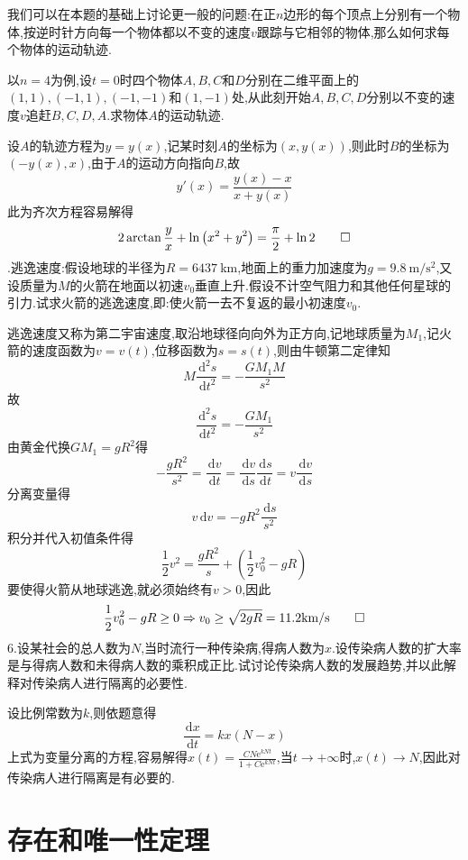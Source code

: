 \documentclass[titlepage,11pt,a4paper,twoside]{report}
\makeatletter
\newcommand\diff{\,\mathrm{d}}
\newcommand\e{\mathrm{e}}
\newenvironment{solve}{\par
	\pushQED{\qed}%
	\normalfont \topsep1\p@\@plus6\p@\relax
	\trivlist
	\item\relax
	{\hspace*{\parindent}{\heiti 解}\@addpunct{:}}\hspace\labelsep\ignorespaces
}{%
	\popQED\endtrivlist\@endpefalse
}
\makeatother
\begin{document}
我们可以在本题的基础上讨论更一般的问题:在正$n$边形的每个顶点上分别有一个物体,按逆时针方向每一个物体都以不变的速度$v$跟踪与它相邻的物体,那么如何求每个物体的运动轨迹.\par
以$n=4$为例,设$t=0$时四个物体$A,B,C$和$D$分别在二维平面上的$(1,1),(-1,1),(-1,-1)$和$(1,-1)$处,从此刻开始$A,B,C,D$分别以不变的速度$v$追赶$B,C,D,A$.求物体$A$的运动轨迹.
\begin{solve}
设$A$的轨迹方程为$y=y(x)$,记某时刻$A$的坐标为$(x,y(x))$,则此时$B$的坐标为$(-y(x),x)$,由于$A$的运动方向指向$B$,故
\[y'(x)=\frac{y(x)-x}{x+y(x)}\]
此为齐次方程容易解得
\[2\arctan\frac{y}{x}+\ln\left(x^2+y^2\right)=\frac{\pi}{2}+\ln2\qedhere\]
\end{solve}
5.{\heiti 逃逸速度}:假设地球的半径为$R=6437\:$km,地面上的重力加速度为$g=9.8\:\mathrm{m}/\mathrm{s}^2$,又设质量为$M$的火箭在地面以初速$v_0$垂直上升.假设不计空气阻力和其他任何星球的引力.试求火箭的逃逸速度,即:使火箭一去不复返的最小初速度$v_0$.
\begin{solve}
逃逸速度又称为第二宇宙速度,取沿地球径向向外为正方向,记地球质量为$M_1$,记火箭的速度函数为$v=v(t)$,位移函数为$s=s(t)$,则由牛顿第二定律知
\[M\frac{\diff^2s}{\diff t^2}=-\frac{GM_1M}{s^2}\]
故\[\frac{\diff^2s}{\diff t^2}=-\frac{GM_1}{s^2}\]
由黄金代换$GM_1=gR^2$得\[-\frac{gR^2}{s^2}=\frac{\diff v}{\diff t}=\frac{\diff v}{\diff s}\frac{\diff s}{\diff t}=v\frac{\diff v}{\diff s}\]
分离变量得
\[v\diff v=-gR^2\frac{\diff s}{s^2}\]
积分并代入初值条件得\[\frac{1}{2}v^2=\frac{gR^2}{s}+\left(\frac{1}{2}v_0^2-gR\right)\]
要使得火箭从地球逃逸,就必须始终有$v>0$,因此
\[\frac{1}{2}v_0^2-gR\geq0\Rightarrow v_0\geq\sqrt{2gR}=11.2\mathrm{km}/\mathrm{s}\qedhere\]
\end{solve}
6.设某社会的总人数为$N$,当时流行一种传染病,得病人数为$x$.设传染病人数的扩大率是与得病人数和未得病人数的乘积成正比.试讨论传染病人数的发展趋势,并以此解释对传染病人进行隔离的必要性.
\begin{solve}
设比例常数为$k$,则依题意得\[\frac{\diff x}{\diff t}=kx(N-x)\]
上式为变量分离的方程,容易解得$x(t)=\frac{CN\e^{kNt}}{1+C\e^{kNt}}$,当$t\to+\infty$时,$x(t)\to N$,因此对传染病人进行隔离是有必要的.
\end{solve}

\chapter{存在和唯一性定理}
\end{document}
